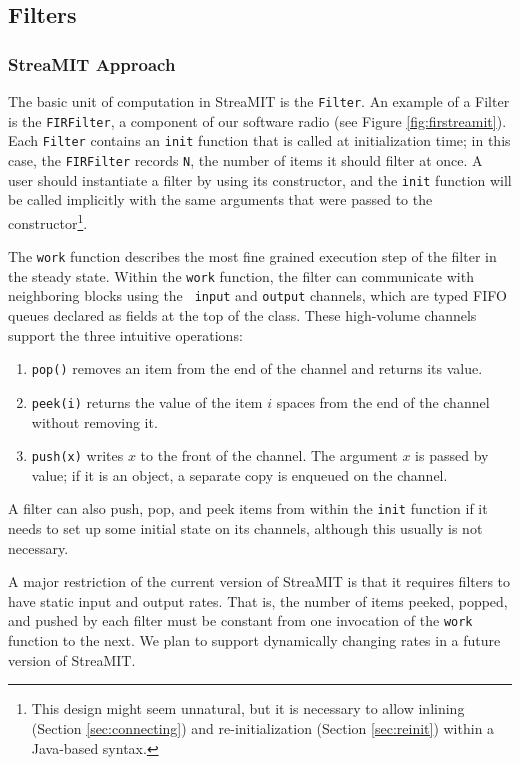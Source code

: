 \subsection{Filters}

\subsubsection{StreaMIT Approach}

The basic unit of computation in StreaMIT is the {\tt Filter}.  An
example of a Filter is the {\tt FIRFilter}, a component of our
software radio (see Figure \ref{fig:firstreamit}).  Each {\tt Filter}
contains an {\tt init} function that is called at initialization time;
in this case, the {\tt FIRFilter} records {\tt N}, the number of items
it should filter at once.  A user should instantiate a filter by using
its constructor, and the {\tt init} function will be called implicitly
with the same arguments that were passed to the
constructor{\footnote{This design might seem unnatural, but it is
necessary to allow inlining (Section \ref{sec:connecting}) and
re-initialization (Section \ref{sec:reinit}) within a Java-based
syntax.}}.

The {\tt work} function describes the most fine grained execution step
of the filter in the steady state.  Within the {\tt work} function,
the filter can communicate with neighboring blocks using the {\tt
input} and {\tt output} channels, which are typed FIFO queues declared
as fields at the top of the class.  These high-volume channels support
the three intuitive operations: 
\begin{enumerate}
\item {\tt pop()} removes an item from
the end of the channel and returns its value.
\item {\tt peek(i)} returns the value of the item $i$ spaces from the end of the channel without
removing it.
\item {\tt push(x)} writes $x$ to the front of
the channel.  The argument $x$ is passed by value; if it is an object,
a separate copy is enqueued on the channel.
\end{enumerate}
A filter can also push, pop, and peek items from within
the {\tt init} function if it needs to set up some initial state on
its channels, although this usually is not necessary.

A major restriction of the current version of StreaMIT is that it
requires filters to have static input and output rates.  That is, the
number of items peeked, popped, and pushed by each filter must be
constant from one invocation of the {\tt work} function to the next.
We plan to support dynamically changing rates in a future version of
StreaMIT.

